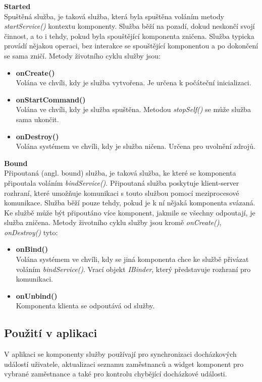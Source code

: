 \documentclass{diplomka}
\begin{document}
\begin{description}[]
\item \textbf{Started}\\
Spuštěná služba, je taková služba, která byla spuštěna voláním metody \emph{startService()} kontextu komponenty. Služba běží na pozadí, dokud neskončí svojí činnost, a to i tehdy, pokud byla spouštějící komponenta zničena. Služba typicka provádí nějakou operaci, bez interakce se spouštějící komponentou a po dokončení se sama zničí. Metody životního cyklu služby jsou: 
\begin{itemize}[]
\item \textbf{onCreate()}\\
Volána ve chvíli, kdy je služba vytvořena. Je určena k počáteční inicializaci.
\item \textbf{onStartCommand()}\\
Volána ve chvíli, kdy je služba spuštěna. Metodou \emph{stopSelf()} se může služba sama ukončit.
\item \textbf{onDestroy()}\\
Volána systémem ve chvíli, kdy je služba ničena. Určena pro uvolnění zdrojů.
\end{itemize}
\item \textbf{Bound}\\
Připoutaná (angl. bound) služba, je taková služba, ke které se komponenta připoutala voláním \emph{bindService()}. Připoutaná služba poskytuje klient-server rozhraní, které umožňuje komunikaci s touto službou pomocí meziprocesové komunikace. Služba běží pouze tehdy, pokud je k ní nějaká komponenta svázaná. Ke službě může být připoutáno více komponent, jakmile se všechny odpoutají, je služba zničena. Metody životního cyklu služby jsou kromě \emph{onCreate()}, \emph{onDestroy()} tyto:
\begin{itemize}[]
\item \textbf{onBind()}\\
Volána systémem ve chvíli, kdy se jiná komponenta chce ke službě přivázat voláním \emph{bindService()}. Vrací objekt \emph{IBinder}, který představuje rozhraní pro komunikaci.
\item \textbf{onUnbind()}\\
Komponenta klienta se odpoutává od služby.
\end{itemize}
\end{description}
\subsection*{Použití v aplikaci}
V aplikaci se komponenty služby používají pro synchronizaci docházkových událostí uživatele, aktualizaci seznamu zaměstnanců a widget komponent pro vybrané zaměstnance a také pro kontrolu chybějící docházkové události.
\end{document}
